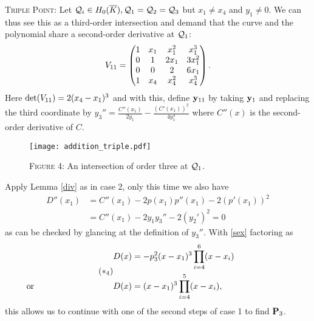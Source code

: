 \documentclass[english,11pt,a4paper]{article}
\begin{document}
\begin{case}
  {\scshape Triple Point:} Let $\q_i \in \enkb , \q_1=\q_2=\q_3$ but $x_1 \neq x_4$ and $y_1 \neq 0$. We can thus see this as a third-order intersection and demand that the curve and the polynomial share a second-order derivative at $\q_1$:
  \begin{align*}\Vtri=
      \begin{pmatrix}
      1 & x_1 & x_1^2 & x_1^3\\
      0 & 1 & 2 x_1 & 3 x_1^2\\
      0 & 0 & 2 & 6x_1\\
      1 & x_4 & x_4^2 & x_4^3\\
    \end{pmatrix}.
  \end{align*}
  Here $\det(\Vtri)=2(x_4-x_1)^3$ and with this, define $\ytri$ by taking $\ydoub$ and replacing the third coordinate by $y_3'' = \frac{C''(x_1)}{2y_1}-\frac{(C'(x_1))^2}{4y_1^3}$ where $C''(x)$ is the second-order derivative of $C$.

\begin{figure}[ht]
  \fline
  \begin{center}
    \vspace{1mm}
    \texttt{[image: addition\_triple.pdf]}

    {\scshape Figure 4}: An intersection of order three at $\q_1$.
  \end{center}
  \vspace{-1.5mm}
  \fline
\end{figure}

  Apply Lemma \ref{div} as in case 2, only this time we also have
  \begin{align*}
    D''(x_1) &= C''(x_1) - 2 p(x_1)p''(x_1) - 2 (p'(x_1))^2\\
             &= C''(x_1) - 2 y_1 y_3''- 2(y_2')^2 = 0
  \end{align*}
  as can be checked by glancing at the definition of $y_3''$. With \eqref{sex} factoring as
  \begin{align} \tag{$*_4$} \begin{split}
    D(x) &= -p_3^2(x-x_1)^3 \prod_{i=4}^6(x-x_i) \\
    \rlap{\hspace{-37mm} or}
    D(x) &= (x-x_1)^3 \prod_{i=4}^5(x-x_i),
  \end{split} \end{align}
  this allows us to continue with one of the second steps of case 1 to find $\P_3$.
\end{case}
\end{document}
